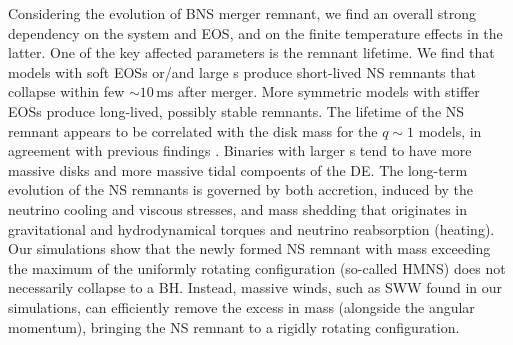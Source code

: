 Considering the \pmerg{} evolution of \ac{BNS} merger remnant, we find an
overall strong dependency on the system \mr{} and \ac{EOS}, and on the 
finite temperature effects in the latter. One of the key affected 
parameters is the remnant lifetime. We find that models with 
soft \acp{EOS} or/and large \mr{}s produce short-lived \ac{NS} remnants that 
collapse within few ${\sim}10\,$ms after merger. 
%
More symmetric models with stiffer \acp{EOS} produce long-lived, possibly 
stable remnants. The lifetime of the \ac{NS} remnant appears to be correlated with the 
disk mass for the $q\sim 1$ models, in agreement with previous findings 
\citep{Radice:2017lry,Radice:2018pdn}.
Binaries with larger \mr{}s tend to have more massive disks and more massive tidal 
compoents of the \ac{DE}.
%
%
The long-term evolution of the \ac{NS} remnants is governed by both accretion, 
induced by the neutrino cooling and viscous stresses, and mass shedding that originates 
in gravitational and hydrodynamical torques and neutrino reabsorption (heating).
Our simulations show that the newly formed \ac{NS} remnant with mass exceeding the 
maximum of the uniformly rotating configuration (so-called \ac{HMNS}) does 
not necessarily collapse to a \ac{BH}. Instead, massive winds, such as \ac{SWW}
found in our simulations, can 
efficiently remove the excess in mass (alongside the angular momentum), bringing 
the \ac{NS} remnant to a rigidly rotating configuration.
%

